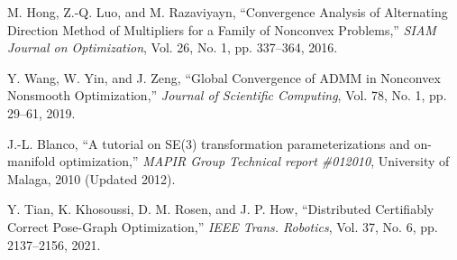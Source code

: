 \begin{thebibliography}{99}
M. Hong, Z.-Q. Luo, and M. Razaviyayn, ``Convergence Analysis of Alternating Direction Method of Multipliers for a Family of Nonconvex Problems,'' {\it SIAM Journal on Optimization}, Vol. 26, No. 1, pp. 337--364, 2016.

Y. Wang, W. Yin, and J. Zeng, ``Global Convergence of ADMM in Nonconvex Nonsmooth Optimization,'' {\it Journal of Scientific Computing}, Vol. 78, No. 1, pp. 29--61, 2019.

J.-L. Blanco, ``A tutorial on SE(3) transformation parameterizations and on-manifold optimization,'' {\it MAPIR Group Technical report \#012010}, University of Malaga, 2010 (Updated 2012).

Y. Tian, K. Khosoussi, D. M. Rosen, and J. P. How, ``Distributed Certifiably Correct Pose-Graph Optimization,'' {\it {IEEE} Trans. Robotics}, Vol. 37, No. 6, pp. 2137--2156, 2021.

\end{thebibliography}
